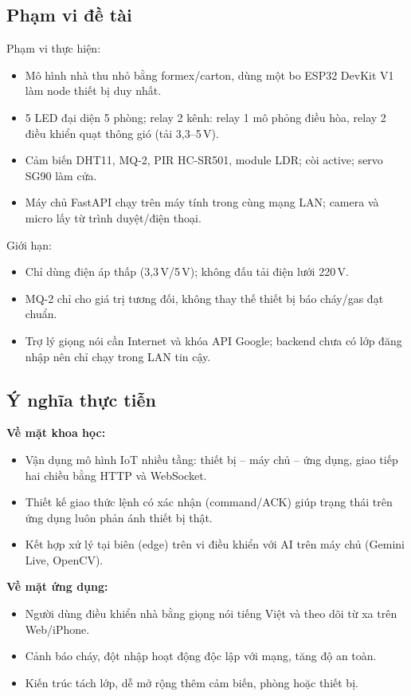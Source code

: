 \documentclass[12pt,a4paper]{extarticle}
\begin{document}
\subsection{Phạm vi đề tài}
Phạm vi thực hiện:
\begin{itemize}
  \item Mô hình nhà thu nhỏ bằng formex/carton, dùng một bo ESP32 DevKit V1 làm node thiết bị duy nhất.
  \item 5 LED đại diện 5 phòng; relay 2 kênh: relay 1 mô phỏng điều hòa, relay 2 điều khiển quạt thông gió (tải 3,3--5\,V).
  \item Cảm biến DHT11, MQ-2, PIR HC-SR501, module LDR; còi active; servo SG90 làm cửa.
  \item Máy chủ FastAPI chạy trên máy tính trong cùng mạng LAN; camera và micro lấy từ trình duyệt/điện thoại.
\end{itemize}
Giới hạn:
\begin{itemize}
  \item Chỉ dùng điện áp thấp (3,3\,V/5\,V); không đấu tải điện lưới 220\,V.
  \item MQ-2 chỉ cho giá trị tương đối, không thay thế thiết bị báo cháy/gas đạt chuẩn.
  \item Trợ lý giọng nói cần Internet và khóa API Google; backend chưa có lớp đăng nhập nên chỉ chạy trong LAN tin cậy.
\end{itemize}

\subsection{Ý nghĩa thực tiễn}
\textbf{Về mặt khoa học:}
\begin{itemize}
  \item Vận dụng mô hình IoT nhiều tầng: thiết bị -- máy chủ -- ứng dụng, giao tiếp hai chiều bằng HTTP và WebSocket.
  \item Thiết kế giao thức lệnh có xác nhận (command/ACK) giúp trạng thái trên ứng dụng luôn phản ánh thiết bị thật.
  \item Kết hợp xử lý tại biên (edge) trên vi điều khiển với AI trên máy chủ (Gemini Live, OpenCV).
\end{itemize}
\textbf{Về mặt ứng dụng:}
\begin{itemize}
  \item Người dùng điều khiển nhà bằng giọng nói tiếng Việt và theo dõi từ xa trên Web/iPhone.
  \item Cảnh báo cháy, đột nhập hoạt động độc lập với mạng, tăng độ an toàn.
  \item Kiến trúc tách lớp, dễ mở rộng thêm cảm biến, phòng hoặc thiết bị.
\end{itemize}
\end{document}
